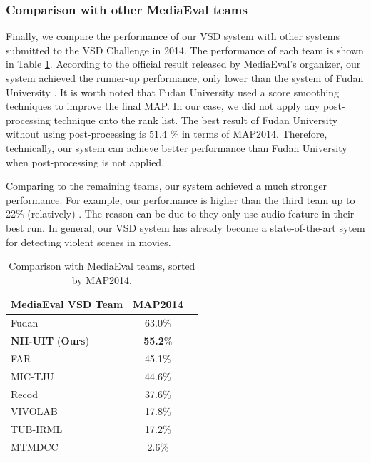 \documentclass[twocolumn]{bmcart}%
\begin{document}
\subsubsection{Comparison with other MediaEval teams}

Finally, we compare the performance of our VSD system with other systems submitted to the VSD Challenge in 2014. The performance of each team is 
shown in Table \ref{tab:mediaeval}. According to the official result released by MediaEval's organizer, our system achieved the runner-up performance, only lower than the system of Fudan University \cite{2014fudan}. It is worth noted that Fudan University used a score smoothing techniques to improve the final MAP. In our case, we did not apply any post-processing technique onto the rank list. The best result of Fudan University without using post-processing is 51.4 \% in terms of MAP2014. Therefore, technically, our system can achieve better performance than Fudan University when post-processing is not applied. 

Comparing to the remaining teams, our system achieved a much stronger performance. For example, our performance is higher than the third team up to 22\% (relatively) \cite{2014far}. The reason can be due to they only use audio feature in their best run. In general, our VSD system has already become a state-of-the-art sytem for detecting violent scenes in movies.
\begin{table}
	\centering
	\caption{Comparison with MediaEval teams, sorted by MAP2014.}
	\begin{tabular}{lcc}
		\hline
		MediaEval VSD Team & MAP2014 \\ \hline
		Fudan \cite{2014fudan} & 63.0\% \\
		\textbf{NII-UIT} \cite{2014nii} (\textbf{Ours}) & \textbf{55.2}\% \\
		FAR \cite{2014far} & 45.1\% \\
		MIC-TJU \cite{2014mic} & 44.6\% \\
		Recod \cite{avila2014recod} & 37.6\% \\
		VIVOLAB \cite{2014vivolab} & 17.8\% \\
		TUB-IRML \cite{2014tub} & 17.2\% \\
		MTMDCC \cite{2014mtm} & 2.6\% \\ \hline
	\end{tabular}%
	\label{tab:mediaeval}%
\end{table}%
\end{document}
